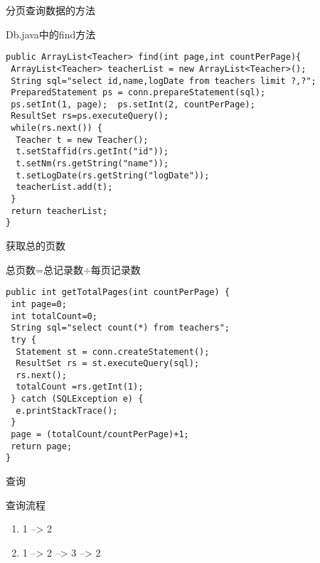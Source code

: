 \documentclass{beamer}
\begin{document}
\begin{frame}[fragile]{分页查询数据的方法}
\begin{block}{Db.java中的find方法}
\begin{verbatim}
public ArrayList<Teacher> find(int page,int countPerPage){
 ArrayList<Teacher> teacherList = new ArrayList<Teacher>();
 String sql="select id,name,logDate from teachers limit ?,?";
 PreparedStatement ps = conn.prepareStatement(sql);
 ps.setInt(1, page);  ps.setInt(2, countPerPage);
 ResultSet rs=ps.executeQuery();
 while(rs.next()) {
  Teacher t = new Teacher();
  t.setStaffid(rs.getInt("id"));
  t.setNm(rs.getString("name"));
  t.setLogDate(rs.getString("logDate"));
  teacherList.add(t);
 }
 return teacherList;
}
\end{verbatim}
\end{block}
\end{frame}
\begin{frame}[fragile]{获取总的页数}

\begin{block}{总页数=总记录数$\div$每页记录数}
\begin{verbatim}
public int getTotalPages(int countPerPage) {
 int page=0;
 int totalCount=0;
 String sql="select count(*) from teachers";
 try {
  Statement st = conn.createStatement();
  ResultSet rs = st.executeQuery(sql);
  rs.next();
  totalCount =rs.getInt(1);
 } catch (SQLException e) {
  e.printStackTrace();
 }
 page = (totalCount/countPerPage)+1;
 return page;
}
\end{verbatim}
\end{block}
\end{frame}
\begin{frame}{查询}
\begin{block}{查询流程}
\begin{enumerate}
\item
1 --> 2
\item
1 --> 2 --> 3 --> 2
\end{enumerate}
\end{block}
\end{frame}
\end{document}
